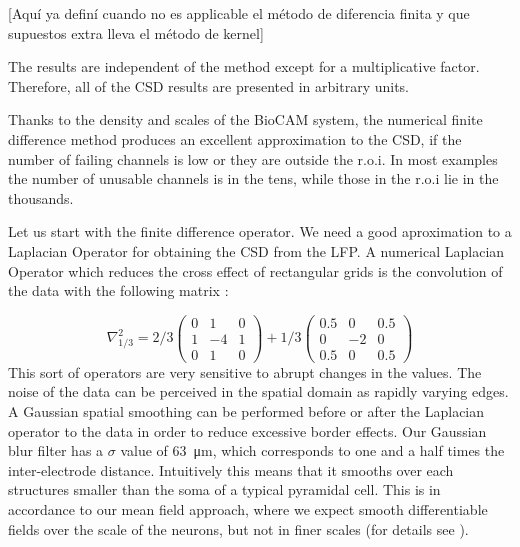 \documentclass[letterpaper,12pts]{article}
\newcommand{\mum}[1]{\SI{#1}{\micro\metre}}
\newcommand{\komment}[1]{{\color{red} [#1]}}
\begin{document}
\komment{Aquí ya definí cuando no es applicable el método de diferencia finita y
  que supuestos extra lleva el método de kernel}

The results are
independent of the method except for a multiplicative factor.
Therefore, all of the CSD results are presented in arbitrary units.

Thanks to the density and scales of the BioCAM system,
the numerical finite difference method
produces an excellent approximation to the CSD,
if the number of failing channels is low or
they are outside the r.o.i.
In most examples the number of unusable channels is in the tens,
while those in the r.o.i lie in the thousands.

Let us start with the finite difference operator. We need a
good aproximation to a Laplacian Operator for obtaining the CSD
from the LFP. 
A  numerical Laplacian Operator which reduces the cross effect of
rectangular grids is the convolution of the data with the following
matrix \cite{Lindberg90}:

\begin{equation}
\nabla^2_{1/3}=2/3
\begin{pmatrix}
  0 & 1 & 0 \\
  1 & -4 & 1 \\
  0 & 1 & 0
\end{pmatrix}
+1/3
\begin{pmatrix}
  0.5 & 0 & 0.5 \\
  0 & -2 & 0 \\
  0.5 & 0 & 0.5
\end{pmatrix}  
\end{equation}
This sort of operators are very sensitive to abrupt changes in the values.
The noise of the data can be perceived in the spatial domain as rapidly varying edges. A Gaussian spatial smoothing
can be performed before or after the Laplacian operator to the data in order to reduce excessive border effects. Our Gaussian blur filter has a $ \sigma$ value of \mum{63}, which corresponds to one and a half times the inter-electrode distance.
Intuitively this means that it smooths over each structures smaller than the soma of a typical pyramidal cell. 
This is  in accordance to our mean field approach, where we expect smooth differentiable fields over the scale of the neurons, but not in finer scales (for details see \cite{Bedard11}).
\end{document}

